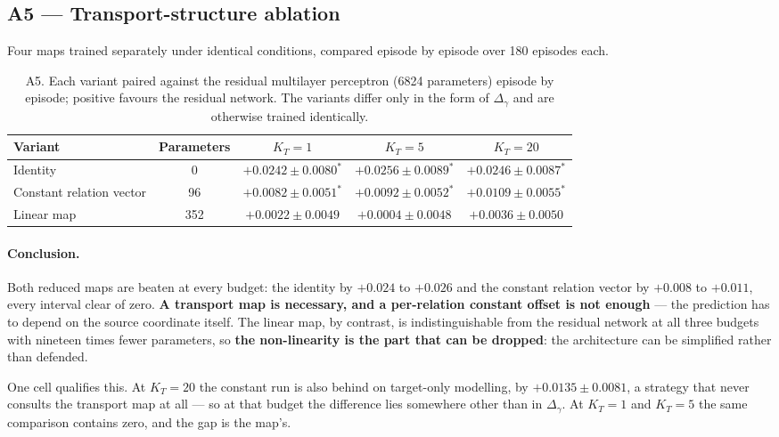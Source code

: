 \documentclass{article}
\begin{document}
\subsection{A5 --- Transport-structure ablation}

Four maps trained separately under identical conditions, compared episode by episode over
180 episodes each.

\begin{table}[h]
\centering
\small
\begin{tabular}{lcccc}
\toprule
Variant & Parameters & $K_T=1$ & $K_T=5$ & $K_T=20$\\
\midrule
Identity & 0 & $+0.0242 \pm 0.0080^{*}$ & $+0.0256 \pm 0.0089^{*}$ & $+0.0246 \pm 0.0087^{*}$\\
Constant relation vector & 96 & $+0.0082 \pm 0.0051^{*}$ & $+0.0092 \pm 0.0052^{*}$ & $+0.0109 \pm 0.0055^{*}$\\
Linear map & 352 & $+0.0022 \pm 0.0049$ & $+0.0004 \pm 0.0048$ & $+0.0036 \pm 0.0050$\\
\bottomrule
\end{tabular}
\caption{A5. Each variant paired against the residual multilayer perceptron (6824
parameters) episode by episode; positive favours the residual network. The variants differ
only in the form of $\Delta_\gamma$ and are otherwise trained identically.}
\end{table}

\paragraph{Conclusion.} Both reduced maps are beaten at every budget: the identity by
$+0.024$ to $+0.026$ and the constant relation vector by $+0.008$ to $+0.011$, every
interval clear of zero. \textbf{A transport map is necessary, and a per-relation constant
offset is not enough} --- the prediction has to depend on the source coordinate itself. The
linear map, by contrast, is indistinguishable from the residual network at all three
budgets with nineteen times fewer parameters, so \textbf{the non-linearity is the part that
can be dropped}: the architecture can be simplified rather than defended.

One cell qualifies this. At $K_T = 20$ the constant run is also behind on target-only
modelling, by $+0.0135 \pm 0.0081$, a strategy that never consults the transport map at all
--- so at that budget the difference lies somewhere other than in $\Delta_\gamma$. At
$K_T = 1$ and $K_T = 5$ the same comparison contains zero, and the gap is the map's.
\end{document}
